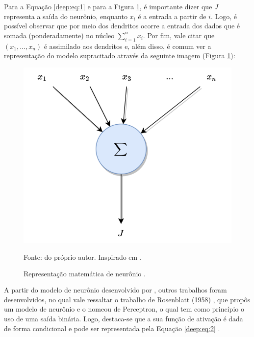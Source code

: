 Para a Equação \ref{deep:eq:1} e para a Figura \ref{deep:fig:2}, é importante dizer que $J$ representa a saída do neurônio, enquanto $x_i$ é a entrada a partir de $i$. Logo, é possível observar que por meio dos dendritos ocorre a entrada dos dados que é somada (ponderadamente) no núcleo $\sum_{i = 1}^{n} x_i$. Por fim, vale citar que $(x_1, ..., x_n)$ é assimilado aos dendritos e, além disso, é comum ver a representação do modelo supracitado através da seguinte imagem (Figura \ref{deep:fig:2}):

\begin{figure}[H]
    \centering
    \caption{Representação matemática de neurônio \cite{mcculloch1943logical}.}
    \includegraphics[width=1\linewidth]{recursos/imagens/deep/neuronio_mc.png}
    \label{deep:fig:2}

    \vspace*{1 cm}
    Fonte: do próprio autor. Inspirado em \cite{mcculloch1943logical}.
\end{figure}

A partir do modelo de neurônio desenvolvido por \cite{mcculloch1943logical},  outros trabalhos foram desenvolvidos, no qual vale ressaltar o trabalho de Rosenblatt (1958) \cite{Rosenblatt1958}, que propôs um modelo de neurônio e o nomeou de Perceptron, o qual tem como princípio o uso de uma saída binária. Logo, destaca-se que a sua função de ativação é dada de forma condicional e pode ser representada pela Equação \ref{deep:eq:2} \cite{Rosenblatt1958}.

